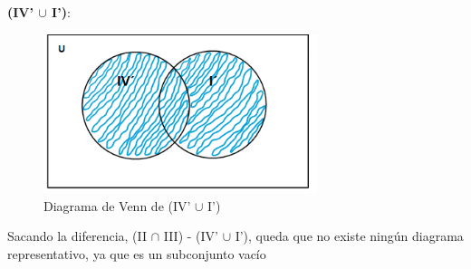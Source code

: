 \newpage

\textbf{(IV' $\cup$ I')}:

\begin{figure}[htbp]
\centering
\includegraphics[width=8cm]{b/bb.png}
\caption[]{Diagrama de Venn de (IV' $\cup$ I')}
\end{figure} 

Sacando la diferencia, (II $\cap$ III) - (IV' $\cup$ I'), queda que no existe ningún diagrama representativo, ya que es un subconjunto vacío



